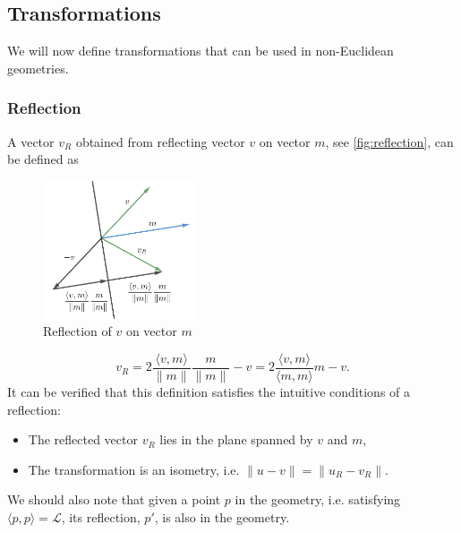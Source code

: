 \subsection{Transformations}
We will now define transformations that can be used in non-Euclidean geometries.

\subsubsection{Reflection}
A vector $v_R$ obtained from reflecting vector $v$ on vector $m$, see \autoref{fig:reflection}, can be defined as
\begin{figure}[!htb]
    \centering
    \includegraphics[width=0.4\textwidth]{chapters/theoretical_foundations/sections/non-eudlidean-spaces/resources/reflection.png}
    \caption{Reflection of $v$ on vector $m$}
    \label{fig:reflection}
\end{figure}
$$v_R = 2 \frac{\langle v, m \rangle}{\lVert m \rVert}\frac{m}{\lVert m \rVert} - v = 2\frac{\langle v, m\rangle}{\langle m,m\rangle}m - v.$$
It can be verified that this definition satisfies the intuitive conditions of a reflection:
\begin{itemize}
    \item The reflected vector $v_R$ lies in the plane spanned by $v$ and $m$,
    \item The transformation is an isometry, i.e. $\lVert u - v \rVert = \lVert u_R - v_R \rVert$.
\end{itemize}
We should also note that given a point $p$ in the geometry, i.e. satisfying $\langle p, p \rangle = \mathcal{L}$, its reflection, $p'$, is also in the geometry.

